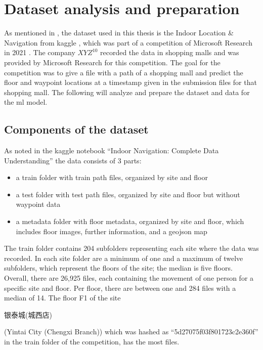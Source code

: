 \chapter{Dataset analysis and preparation}\label{ch:data-ana}

As mentioned in , the dataset used in this thesis is the Indoor Location \& Navigation from kaggle \cite{kaggle}, which was part of a competition of Microsoft Research in 2021 \cite{IndoorLocationNavigation}.
The company \(XYZ^{10}\) recorded the data in shopping malls and was provided by Microsoft Research for this competition.
The goal for the competition was to give a file with a path of a shopping mall and predict the floor and waypoint locations at a timestamp given in the submission files for that shopping mall.
The following will analyze and prepare the dataset and data for the \ac{ml} model.


\section{Components of the dataset}\label{sec:data}
As noted in the kaggle notebook ``Indoor Navigation: Complete Data Understanding'' \cite{IndoorNavigationUnderstanding} the data consists of 3 parts:

\begin{itemize}
    \item a train folder with train path files, organized by site and floor
    \item a test folder with test path files, organized by site and floor but without waypoint data
    \item a metadata folder with floor metadata, organized by site and floor, which includes floor images, further information, and a geojson map
\end{itemize}

The train folder contains 204 subfolders representing each site where the data was recorded.
In each site folder are a minimum of one and a maximum of twelve subfolders, which represent the floors of the site; the median is five floors.
Overall, there are 26,925 files, each containing the movement of one person for a specific site and floor.
Per floor, there are between one and 284 files with a median of 14.
The floor F1 of the site \begin{CJK*}{UTF8}{gbsn}银泰城(城西店)\end{CJK*} (Yintai City (Chengxi Branch)) which was hashed as ``5d27075f03f801723c2e360f'' in the train folder of the competition, has the most files.

